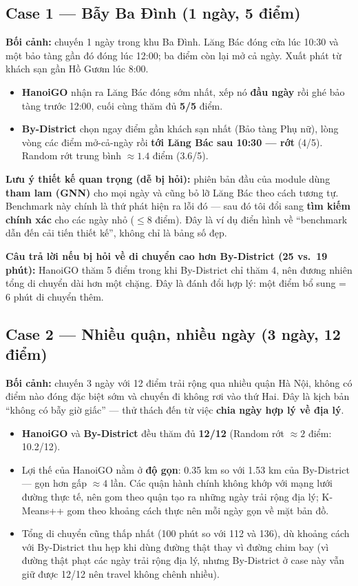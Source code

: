 \documentclass[12pt,a4paper]{article}
\begin{document}
\subsection*{Case 1 --- Bẫy Ba Đình (1 ngày, 5 điểm)}

\textbf{Bối cảnh:} chuyến 1 ngày trong khu Ba Đình. Lăng Bác đóng cửa
lúc 10:30 và một bảo tàng gần đó đóng lúc 12:00; ba điểm còn lại mở cả ngày.
Xuất phát từ khách sạn gần Hồ Gươm lúc 8:00.

\begin{itemize}[nosep]
  \item \textbf{HanoiGO} nhận ra Lăng Bác đóng sớm nhất, xếp nó \textbf{đầu ngày}
  rồi ghé bảo tàng trước 12:00, cuối cùng thăm đủ \textbf{5/5} điểm.
  \item \textbf{By-District} chọn ngay điểm gần khách sạn nhất (Bảo tàng Phụ nữ),
  lòng vòng các điểm mở-cả-ngày rồi \textbf{tới Lăng Bác sau 10:30 --- rớt}
  (4/5). Random rớt trung bình $\approx 1.4$ điểm (3.6/5).
\end{itemize}

\textbf{Lưu ý thiết kế quan trọng (dễ bị hỏi):} phiên bản đầu của module dùng
\textbf{tham lam (GNN)} cho mọi ngày và cũng bỏ lỡ Lăng Bác theo cách tương tự.
Benchmark này chính là thứ phát hiện ra lỗi đó --- sau đó tôi đổi sang
\textbf{tìm kiếm chính xác} cho các ngày nhỏ ($\le 8$ điểm). Đây là ví dụ điển
hình về ``benchmark dẫn đến cải tiến thiết kế'', không chỉ là bảng số đẹp.

\textbf{Câu trả lời nếu bị hỏi về di chuyển cao hơn By-District (25 vs.\ 19
phút):} HanoiGO thăm 5 điểm trong khi By-District chỉ thăm 4, nên đương nhiên
tổng di chuyển dài hơn một chặng. Đây là đánh đổi hợp lý: một điểm bổ sung = 6
phút di chuyển thêm.

\subsection*{Case 2 --- Nhiều quận, nhiều ngày (3 ngày, 12 điểm)}

\textbf{Bối cảnh:} chuyến 3 ngày với 12 điểm trải rộng qua nhiều quận Hà Nội,
không có điểm nào đóng đặc biệt sớm và chuyến đi không rơi vào thứ Hai. Đây là
kịch bản ``không có bẫy giờ giấc'' --- thử thách đến từ việc \textbf{chia ngày
hợp lý về địa lý}.

\begin{itemize}[nosep]
  \item \textbf{HanoiGO} và \textbf{By-District} đều thăm đủ \textbf{12/12}
  (Random rớt $\approx 2$ điểm: 10.2/12).
  \item Lợi thế của HanoiGO nằm ở \textbf{độ gọn}: 0.35 km so với 1.53 km của
  By-District --- gọn hơn gấp $\approx 4$ lần. Các quận hành chính không khớp
  với mạng lưới đường thực tế, nên gom theo quận tạo ra những ngày trải rộng
  địa lý; K-Means++ gom theo khoảng cách thực nên mỗi ngày gọn về mặt bản đồ.
  \item Tổng di chuyển cũng thấp nhất (100 phút so với 112 và 136), dù khoảng
  cách với By-District thu hẹp khi dùng đường thật thay vì đường chim bay (vì
  đường thật phạt các ngày trải rộng địa lý, nhưng By-District ở case này vẫn
  giữ được 12/12 nên travel không chênh nhiều).
\end{itemize}
\end{document}

